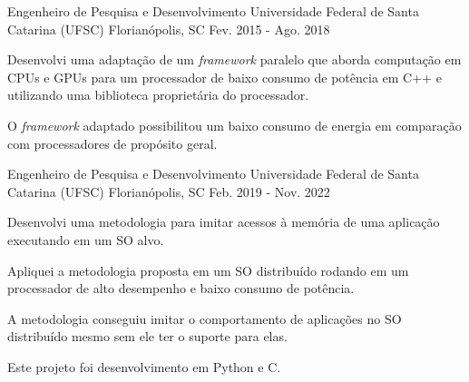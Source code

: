 

\begin{cventries}


    \cventry
    {Engenheiro de Pesquisa e Desenvolvimento} %
    {Universidade Federal de Santa Catarina (UFSC)} %
    {Florianópolis, SC} %
    {Fev. 2015 - Ago. 2018} %
    {
        \begin{cvitems} %
            \item {Desenvolvi uma adaptação de um \textit{framework} paralelo que aborda
                    computação em CPUs e GPUs para um processador de baixo consumo de potência
                em C++ e utilizando uma biblioteca proprietária do processador.}
            \item {O \textit{framework} adaptado possibilitou um baixo consumo de
                energia em comparação com processadores de propósito geral.}
            \end{cvitems}
        }


    \cventry
    {Engenheiro de Pesquisa e Desenvolvimento} %
    {Universidade Federal de Santa Catarina (UFSC)} %
    {Florianópolis, SC} %
    {Feb. 2019 - Nov. 2022} %
    {
        \begin{cvitems} %
        \item {Desenvolvi uma metodologia para imitar acessos à memória de
            uma aplicação executando em um SO alvo.}
        \item{Apliquei a metodologia proposta em um SO distribuído rodando
                em um processador de alto desempenho e baixo consumo de
            potência.}
        \item{A metodologia conseguiu imitar o comportamento de aplicações no SO
            distribuído mesmo sem ele ter o suporte para elas.}
        \item{Este projeto foi desenvolvimento em Python e C.}
        \end{cvitems}
    }


\end{cventries}
